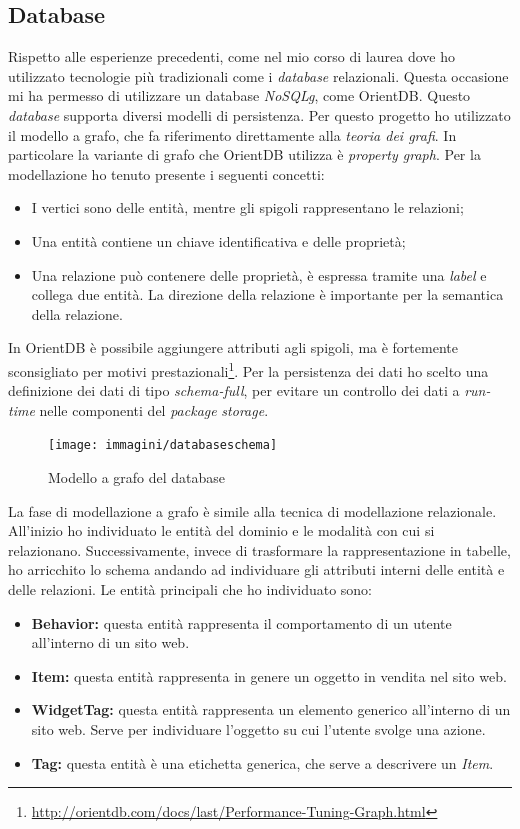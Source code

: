 \subsection{Database}
Rispetto alle esperienze precedenti, come nel mio corso di laurea dove ho utilizzato tecnologie più tradizionali come i \emph{database} relazionali. Questa occasione mi ha permesso di utilizzare un database \emph{\gls{NoSQLg}}, come OrientDB. Questo \emph{database} supporta diversi modelli di persistenza. Per questo progetto ho utilizzato il modello a grafo, che fa riferimento direttamente alla \emph{teoria dei grafi}. In particolare la variante di grafo che OrientDB utilizza è \emph{property graph}. Per la modellazione ho tenuto presente i seguenti concetti:
\begin{itemize}
\item I vertici sono delle entità, mentre gli spigoli rappresentano le relazioni;
\item Una entità contiene un chiave identificativa e delle proprietà; 
\item Una relazione può contenere delle proprietà, è espressa tramite una \emph{label} e collega due entità. La direzione della relazione è importante per la semantica della relazione.
\end{itemize}
In OrientDB è possibile aggiungere attributi agli spigoli, ma è fortemente sconsigliato per motivi prestazionali\footnote{\url{http://orientdb.com/docs/last/Performance-Tuning-Graph.html}}. Per la persistenza dei dati ho scelto una definizione dei dati di tipo \emph{schema-full}, per evitare un controllo dei dati a \emph{run-time} nelle componenti del \emph{package} \emph{storage}.
\newpage
\begin{figure}[h]
\centering
\texttt{[image: immagini/databaseschema]}
\caption{Modello a grafo del database}
\label{fig:database-schema}
\end{figure}
La fase di modellazione a grafo è simile alla tecnica di modellazione relazionale. All'inizio ho individuato le entità del dominio e le modalità con cui si relazionano. Successivamente, invece di trasformare la rappresentazione in tabelle, ho arricchito lo schema andando ad individuare gli attributi interni delle entità e delle relazioni. Le entità principali che ho individuato sono:
\begin{itemize}
\item \textbf{Behavior:} questa entità rappresenta il comportamento di un utente all'interno di un sito web.
\item \textbf{Item:} questa entità rappresenta in genere un oggetto in vendita nel sito web.
\item \textbf{WidgetTag:} questa entità rappresenta un elemento generico all'interno di un sito web. Serve per individuare l'oggetto su cui l'utente svolge una azione.
\item \textbf{Tag:} questa entità è una etichetta generica, che serve a descrivere un \emph{Item}.
\end{itemize}
